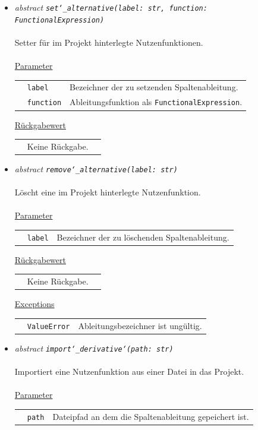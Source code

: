 \documentclass{article}
\begin{document}
\begin{itemize}
\item \textit{\flqq{}abstract\frqq} \texttt{\textit{set\char`_alternative(label: str, function: FunctionalExpression)}}\\\\
Setter für im Projekt hinterlegte Nutzenfunktionen.
\\\\
\underline{Parameter}\\
\begin{tabular}{lll}
 & \texttt{label} & Bezeichner der zu setzenden Spaltenableitung.\\
 & \texttt{function} & Ableitungsfunktion als \texttt{FunctionalExpression}.\\
\end{tabular}

\underline{Rückgabewert}\\
\begin{tabular}{lll}
 & Keine Rückgabe.\\
\end{tabular}


\item \textit{\flqq{}abstract\frqq} \texttt{\textit{remove\char`_alternative(label: str)}}\\\\
Löscht eine im Projekt hinterlegte Nutzenfunktion.
\\\\
\underline{Parameter}\\
\begin{tabular}{lll}
 & \texttt{label} & Bezeichner der zu löschenden Spaltenableitung.\\
\end{tabular}

\underline{Rückgabewert}\\
\begin{tabular}{lll}
 & Keine Rückgabe.\\
\end{tabular}

\underline{Exceptions}\\
\begin{tabular}{lll}
 & \texttt{ValueError} & Ableitungsbezeichner ist ungültig.\\
\end{tabular}


\item \textit{\flqq{}abstract\frqq} \texttt{\textit{import\char`_derivative\char`(path: str)}}\\\\
Importiert eine Nutzenfunktion aus einer Datei in das Projekt.
\\\\
\underline{Parameter}\\
\begin{tabular}{lll}
 & \texttt{path} & Dateipfad an dem die Spaltenableitung gepeichert ist.\\
\end{tabular}


\end{itemize}
\end{document}
